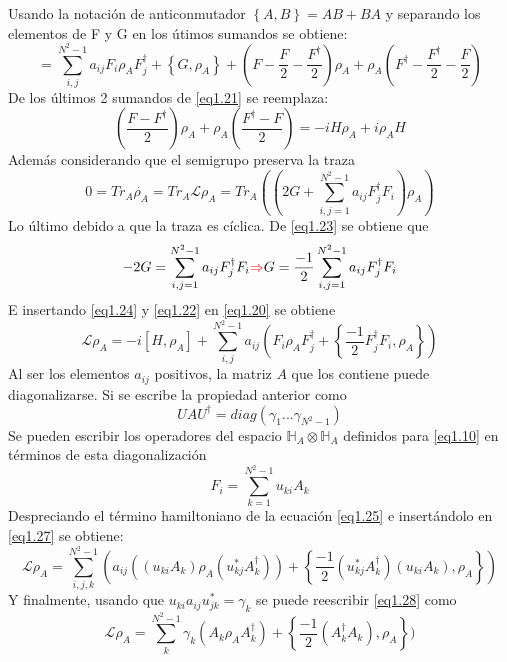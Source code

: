 \documentclass{book}
\begin{document}
Usando la notación de anticonmutador $\left\{A,B\right\}=AB+BA$ y separando los elementos de F y G en los útimos sumandos se obtiene:
\begin{equation}\label{eq1.21}=\sum_{i,j}^{N^2-1}a_{ij}F_i\rho_A F_j^\dag+\left\{G,\rho_A\right\}+(F-\frac{F}{2}-\frac{F^\dag}{2})\rho_A+\rho_A(F^\dag-\frac{F^\dag}{2}-\frac{F}{2})\end{equation}
De los últimos 2 sumandos de \textcolor{blue}{\ref{eq1.21}} se reemplaza:
\begin{equation}\label{eq1.22} (\frac{F-F^\dag}{2})\rho_A+\rho_A(\frac{F^\dag-F}{2})=-iH\rho_A+i\rho_AH\end{equation}
Además considerando que el semigrupo preserva la traza
\begin{equation} \label{eq1.23}0=Tr_A\dot{\rho_A}=Tr_A\mathcal{L}\rho_A=Tr_A((2G+\sum_{i,j=1}^{N^2-1}a_{ij}F_j^\dag F_i)\rho_A)\end{equation}
Lo último debido a que la traza es cíclica. De \textcolor{blue}{\ref{eq1.23}} se obtiene que
\begin{equation}\label{eq1.24}-2G=\sum_{i,j=1}^{N^2-1}a_{ij}F_j^\dag F_i \textcolor{red}{\Rightarrow} G=\frac{-1}{2}\sum_{i,j=1}^{N^2-1}a_{ij}F_j^\dag F_i\end{equation}
E insertando \textcolor{blue}{\ref{eq1.24}} y \textcolor{blue}{\ref{eq1.22}} en \textcolor{blue}{\ref{eq1.20}} se obtiene
\begin{equation}\label{eq1.25}\mathcal{L}\rho_A=-i[H,\rho_A]+\sum_{i,j}^{N^2-1}a_{ij}(F_i\rho_AF_j^\dag+\left\{\frac{-1}{2}F_j^\dag F_i,\rho_A\right\})\end{equation}
Al ser los elementos $a_{ij}$ positivos, la matriz $A$ que los contiene puede diagonalizarse. Si se escribe la propiedad anterior como
\begin{equation}\label{eq1.26} UAU^\dag=diag(\gamma_1...\gamma_{N^2-1})\end{equation}
Se pueden escribir los operadores del espacio $\mathbb{H}_A\otimes\mathbb{H}_A$ definidos para \textcolor{blue}{\ref{eq1.10}} en términos de esta diagonalización
\begin{equation}\label{eq1.27} F_i=\sum_{k=1}^{N^2-1}u_{ki}A_k\end{equation} Despreciando el término hamiltoniano de la ecuación \textcolor{blue}{\ref{eq1.25}} e insertándolo en \textcolor{blue}{\ref{eq1.27}} se obtiene:
\begin{equation}\label{eq1.28}\mathcal{L}\rho_A=\sum_{i,j,k}^{N^2-1}( a_{ij}((u_{ki}A_k)\rho_A(u_{kj}^*A_k^\dag))+\left\{\frac{-1}{2}(u_{kj}^*A_k^\dag) (u_{ki}A_k),\rho_A\right\})\end{equation}
Y finalmente, usando que $u_{ki}a_{ij}u_{jk}^*=\gamma_k$ se puede reescribir \textcolor{blue}{\ref{eq1.28}} como 
\begin{equation}\label{eq1.29}\mathcal{L}\rho_A=\sum_k^{N^2-1}\gamma_k(A_k\rho_A A_k^\dag)+\left\{\frac{-1}{2}(A_k^\dag A_k),\rho_A\right\})\end{equation}
\end{document}

